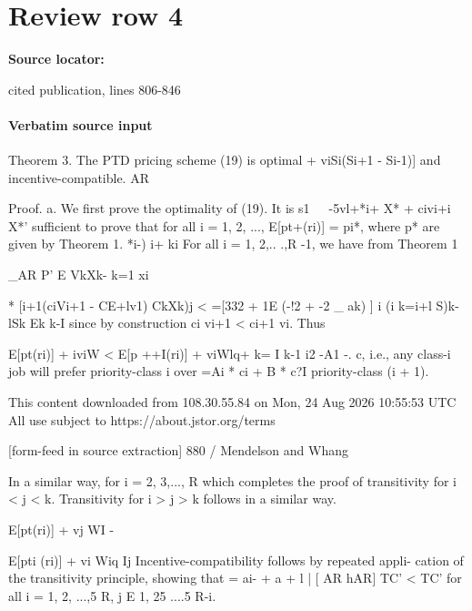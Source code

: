 \documentclass[10pt]{article}
\begin{document}
\section*{Review row 4}
\textbf{Source locator:} {\footnotesize\raggedright cited publication, lines 806-\allowbreak{}846\par}
\paragraph{Verbatim source input}
\begin{ReviewVerbatim}
Theorem 3. The PTD pricing scheme (19) is optimal
                                                                                                          + viSi(Si+1 - Si-1)]
and incentive-compatible.
                                                                               AR

Proof. a. We first prove the optimality of (19). It is                         s1~~~-5vl+*i+ X* + civi+i X*'
sufficient to prove that for all i = 1, 2, ...,
E[pt+(ri)] = pi*, where p* are given by Theorem 1.                             *i-)              i+         ki
For all i = 1, 2,.. .,R -1, we have from Theorem 1

                                                                            _AR
P' E VkXk-
      k=1 xi


                                                                            * [i+1(ciVi+1 - CE+lv1) CkXk)j <
       =[332 + 1E (-!2 + -2 _ ak) ]
          i (i k=i+l S)k-lSk Ek k-I
                                                                     since by construction ci vi+1 < ci+1 vi. Thus

                                                                     E[pt(ri)] + iviW < E[p ++I(ri)] + viWlq+
            k= I k-1 i2
        -A1 -. c,
                                                                    i.e., any class-i job will prefer priority-class i over
        =Ai * ci + B * c?I                                          priority-class (i + 1).




                                               This content downloaded from
                             108.30.55.84 on Mon, 24 Aug 2026 10:55:53 UTC
                                       All use subject to https://about.jstor.org/terms

[form-feed in source extraction]
880 / Mendelson and Whang

  In a similar way, for i = 2, 3,..., R                                which completes the proof of transitivity for i < j <
                                                                       k. Transitivity for i > j > k follows in a similar way.
{E[pt(ri)] + vj WI - {E[pti (ri)] + vi Wiq Ij
                                                                         Incentive-compatibility follows by repeated appli-
                                                                       cation of the transitivity principle, showing that
       = ai- + a + l | [ AR hAR]                                       TC' < TC' for all i = 1, 2, ...,5 R, j E {1, 25 ....5
                                                                       R}-{i}.

}}
\end{ReviewVerbatim}
\end{document}
